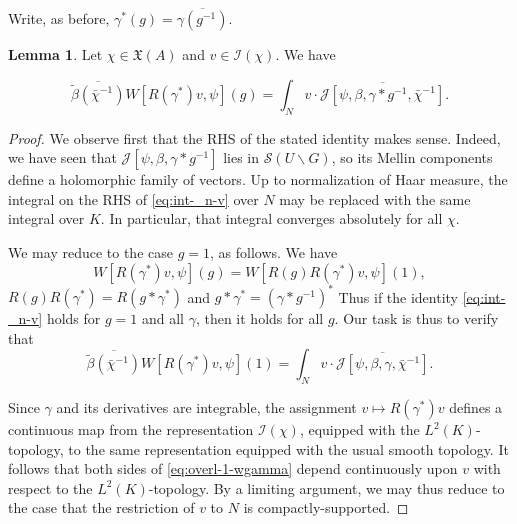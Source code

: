 \documentclass[reqno]{amsart}
\theoremstyle{plain} \newtheorem{theorem} {Theorem}
\theoremstyle{definition} \newtheorem{definition} [theorem] {Definition}
\theoremstyle{itplain} %
\newtheorem{lemma}[theorem]{Lemma}
\numberwithin{equation}{section}
\numberwithin{theorem}{section}
\begin{document}
Write, as before, $\gamma^*(g) = \overline{\gamma(g^{-1})}$.
\begin{lemma}\label{lem:scratch-research:let-chi-in}
  Let $\chi \in \mathfrak{X}(A)$ and $v \in \mathcal{I}(\chi)$.   We have

  \begin{equation}\label{eq:int-_n-v}
  \overline{\tilde{\beta}(\bar{\chi}^{-1})}
  W[R(\gamma^*) v,\psi](g)
  =
  \int _{N} v \cdot \overline{\mathcal{J}[\psi, \beta, \gamma \ast g^{-1}, \bar{\chi}^{-1}]}.
\end{equation}
\end{lemma}
\begin{proof}
  We observe first that the RHS of the stated identity makes sense.  Indeed, we have seen that $\mathcal{J}[\psi,\beta,\gamma \ast g^{-1}]$ lies in $\mathcal{S}(U \backslash G)$, so its Mellin components define a holomorphic family of vectors.  Up to normalization of Haar measure, the integral on the RHS of \eqref{eq:int-_n-v} over $N$ may be replaced with the same integral over $K$.  In particular, that integral converges absolutely for all $\chi$.

  We may reduce to the case $g = 1$, as follows.  We have
  \begin{equation*}
    W[ R(\gamma^* ) v, \psi](g) = W[R(g) R(\gamma^* ) v, \psi](1),
  \end{equation*}
  $R(g ) R(\gamma^*) = R(g \ast \gamma^*)$ and $g \ast \gamma^* = (\gamma \ast g^{-1})^*$ Thus if the identity \eqref{eq:int-_n-v} holds for $g=1$ and all $\gamma$, then it holds for all $g$.  Our task is thus to verify that
  \begin{equation}\label{eq:overl-1-wgamma}
  \overline{\tilde{\beta}(\bar{\chi}^{-1})}
  W[R(\gamma^*) v,\psi](1)
  =
  \int _{N} v \cdot \overline{\mathcal{J}[\psi, \beta, \gamma, \bar{\chi}^{-1}]}.
\end{equation}

Since $\gamma$ and its derivatives are integrable, the assignment $v \mapsto R(\gamma^*) v$ defines a continuous map from the representation $\mathcal{I}(\chi)$, equipped with the $L^2(K)$-topology, to the same representation equipped with the usual smooth topology.  It follows that both sides of \eqref{eq:overl-1-wgamma}  depend continuously upon $v$ with respect to the $L^2(K)$-topology.  By a limiting argument, we may thus reduce to the case that the restriction of $v$ to $N$ is compactly-supported.


\end{proof}
\end{document}
